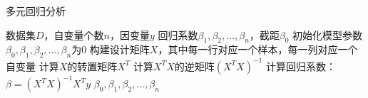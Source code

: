 \documentclass{article}
\begin{document}
	
	\begin{algorithm}
		\caption{多元回归分析}
		\begin{algorithmic}[1]
			\Require 数据集$D$，自变量个数$n$，因变量$y$
			\Ensure 回归系数$\beta_1, \beta_2, \ldots, \beta_n$，截距$\beta_0$
			\State 初始化模型参数$\beta_0, \beta_1, \beta_2, \ldots, \beta_n$为0
			\State 构建设计矩阵$X$，其中每一行对应一个样本，每一列对应一个自变量
			\State 计算$X$的转置矩阵$X^T$
			\State 计算$X^T X$的逆矩阵$(X^T X)^{-1}$
			\State 计算回归系数：$\beta = (X^T X)^{-1} X^T y$
			\State \Return $\beta_0, \beta_1, \beta_2, \ldots, \beta_n$
		\end{algorithmic}
	\end{algorithm}
	
\end{document}
